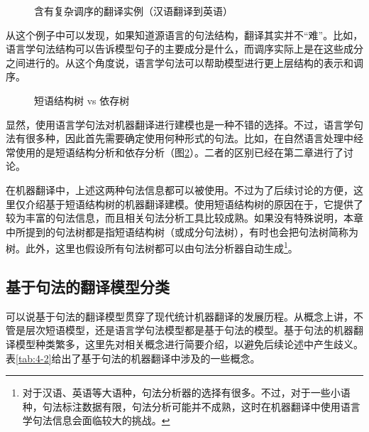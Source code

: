 \begin{figure}[htp]
\centering

\setlength{\belowcaptionskip}{-0.5em}
\caption{含有复杂调序的翻译实例（汉语翻译到英语）}
\label{fig:4-42}
\end{figure}

\parinterval 从这个例子中可以发现，如果知道源语言的句法结构，翻译其实并不``难''。比如，语言学句法结构可以告诉模型句子的主要成分是什么，而调序实际上是在这些成分之间进行的。从这个角度说，语言学句法可以帮助模型进行更上层结构的表示和调序。

\begin{figure}[htp]
\centering

\setlength{\belowcaptionskip}{-1.0em}
\caption{短语结构树 vs 依存树}
\label{fig:4-43}
\end{figure}

\parinterval 显然，使用语言学句法对机器翻译进行建模也是一种不错的选择。不过，语言学句法有很多种，因此首先需要确定使用何种形式的句法。比如，在自然语言处理中经常使用的是短语结构分析和依存分析（图\ref{fig:4-43}）。二者的区别已经在第二章进行了讨论。

\parinterval 在机器翻译中，上述这两种句法信息都可以被使用。不过为了后续讨论的方便，这里仅介绍基于短语结构树的机器翻译建模。使用短语结构树的原因在于，它提供了较为丰富的句法信息，而且相关句法分析工具比较成熟。如果没有特殊说明，本章中所提到的句法树都是指短语结构树（或成分句法树），有时也会把句法树简称为树。此外，这里也假设所有句法树都可以由句法分析器自动生成\footnote[7]{对于汉语、英语等大语种，句法分析器的选择有很多。不过，对于一些小语种，句法标注数据有限，句法分析可能并不成熟，这时在机器翻译中使用语言学句法信息会面临较大的挑战。}。


\subsection{基于句法的翻译模型分类}

\parinterval 可以说基于句法的翻译模型贯穿了现代统计机器翻译的发展历程。从概念上讲，不管是层次短语模型，还是语言学句法模型都是基于句法的模型。基于句法的机器翻译模型种类繁多，这里先对相关概念进行简要介绍，以避免后续论述中产生歧义。表\ref{tab:4-2}给出了基于句法的机器翻译中涉及的一些概念。

